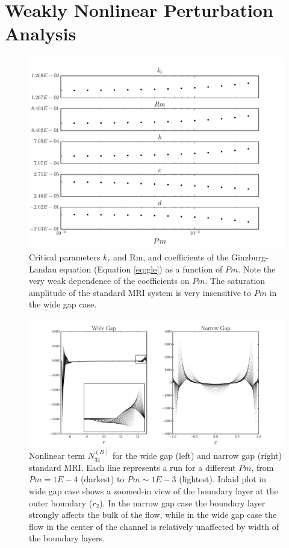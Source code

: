 \documentclass{emulateapj}
\newcommand\reym{\mathrm{Rm}}
\begin{document}
\section{Weakly Nonlinear Perturbation Analysis}\label{sec:wnl_analysis}

\begin{figure}
\centering
\includegraphics[width=\columnwidth]{../figures/widegap_coeffs_by_Pm.pdf}
\caption{Critical parameters $k_c$ and $\reym$, and coefficients of the Ginzburg-Landau equation (Equation \ref{eq:gle}) as a function of $Pm$. Note the very weak dependence of the coefficients on $Pm$. The saturation amplitude of the standard MRI system is very insensitive to $Pm$ in the wide gap case.}\label{fig:coefficients}
\end{figure}

\begin{figure}
\centering
\includegraphics[width=\textwidth]{../figures/wide_narrow_gap_N31_B.pdf}
\caption{Nonlinear term $N_{31}^{(B)}$ for the wide gap (left) and narrow gap (right) standard MRI. Each line represents a run for a different $Pm$, from $Pm = 1E-4$ (darkest) to $Pm \sim 1E-3$ (lightest). Inlaid plot in wide gap case shows a zoomed-in view of the boundary layer at the outer boundary ($r_2$). In the narrow gap case the boundary layer strongly affects the bulk of the flow, while in the wide gap case the flow in the center of the channel is relatively unaffected by width of the boundary layers.}\label{fig:wide_narrow_N31B}
\end{figure}
\end{document}
